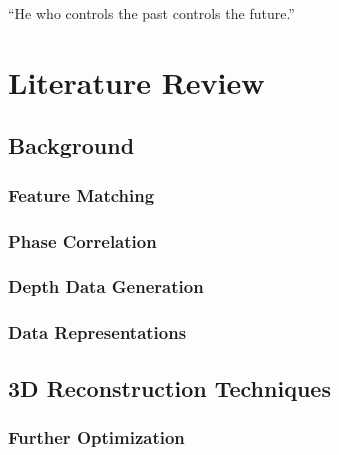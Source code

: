 \begin{savequote}[8cm]
  ``He who controls the past controls the future.''
\end{savequote}
\makeatletter
\chapter{Literature Review}

\section{Background}

\subsection{Feature Matching}


\subsection{Phase Correlation}
\label{Sec:SuperficialPCSection}


\subsection{Depth Data Generation}
\label{DepthDataGenSection}



\subsection{Data Representations}


\section{3D Reconstruction Techniques}

\subsection{Further Optimization}


